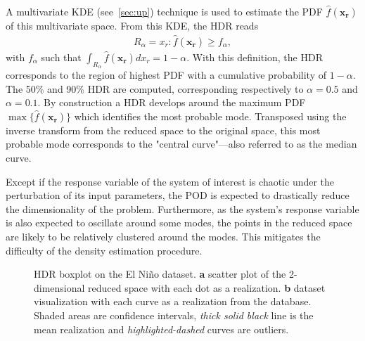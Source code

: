A multivariate KDE (see~\cref{sec:up}) technique is used to estimate the PDF $\hat{f}(\mathbf{x_r})$ of this multivariate space. From this KDE, the HDR reads
\begin{align}
R_\alpha = {x_r: \hat{f}(\mathbf{x_r}) \geq f_{\alpha}},
\end{align}
\noindent with $f_{\alpha}$ such that $\int_{R_\alpha} \hat{f}(\mathbf{x_r}) d x_r = 1 - \alpha$. With this definition, the HDR corresponds to the region of highest PDF with a cumulative probability of $1-\alpha$. The 50\% and 90\% HDR are computed, corresponding respectively to $\alpha=0.5$ and $\alpha=0.1$. By construction  a HDR develops around the maximum PDF $\max \{\hat{f}(\mathbf{x_r})\}$ which identifies the most probable mode. Transposed using the inverse transform from the reduced space to the original space, this most probable mode corresponds to the "central curve"---also referred to as the median curve. 

Except if the response variable of the system of interest is chaotic under the perturbation of its input parameters, the POD is expected to drastically reduce the dimensionality of the problem. Furthermore, as the system's response variable is also expected to oscillate around some modes, the points in the reduced space are likely to be relatively clustered around the modes. This mitigates the difficulty of the density estimation procedure.

\begin{figure}[!ht]               
\centering
{}
\caption{HDR boxplot on the El Ni\~no dataset. \textbf{a} scatter plot of the 2-dimensional reduced space with each dot as a realization. \textbf{b} dataset visualization with each curve as a realization from the database. Shaded areas are confidence intervals, \emph{thick solid black} line is the mean realization and \emph{highlighted-dashed} curves are outliers.}
\label{fig:elnino}
\end{figure}

